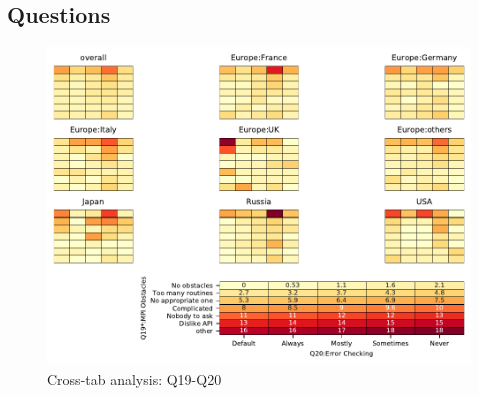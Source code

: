 
\subsection{Questions}


\begin{figure}
\begin{center}
\includegraphics[width=12cm]{../pdfs/Q19-Q20.pdf}
\caption{Cross-tab analysis: Q19-Q20}
\label{fig:Q19-Q20}
\end{center}
\end{figure}
